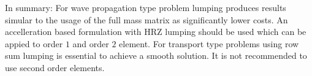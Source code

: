 In summary: For wave propagation type problem lumping produces results simular to the usage of the full mass matrix as significantly 
lower costs. An accelleration based formulation with HRZ lumping should be used which can be appied to order $1$ and order $2$
element. For transport type problems using row sum lumping is essential to achieve a smooth solution. It is not recommended to 
use second order elements.



